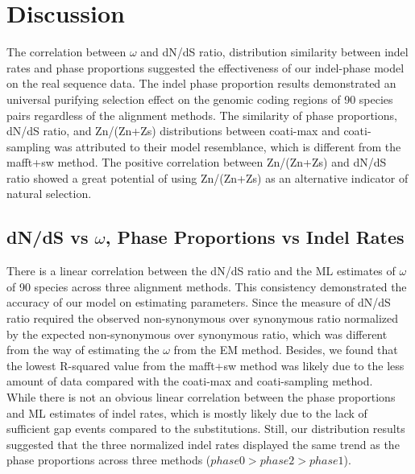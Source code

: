 \section{Discussion}
The correlation between $\omega$ and dN/dS ratio, distribution similarity between indel rates and phase proportions suggested the effectiveness of our indel-phase model on the real sequence data. The indel phase proportion results demonstrated an universal purifying selection effect on the genomic coding regions of 90 species pairs regardless of the alignment methods. The similarity of phase proportions, dN/dS ratio, and Zn/(Zn+Zs) distributions between coati-max and coati-sampling was attributed to their model resemblance, which is different from the mafft+sw method. The positive correlation between Zn/(Zn+Zs) and dN/dS ratio showed a great potential of using Zn/(Zn+Zs) as an alternative indicator of natural selection.

\subsection{dN/dS vs $\omega$, Phase Proportions vs Indel Rates}
There is a linear correlation between the dN/dS ratio and the ML estimates of $\omega$ of 90 species across three alignment methods. This consistency demonstrated the accuracy of our model on estimating parameters. Since the measure of dN/dS ratio required the observed non-synonymous over synonymous ratio normalized by the expected non-synonymous over synonymous ratio, which was different from the way of estimating the $\omega$ from the EM method. Besides, we found that the lowest R-squared value from the mafft+sw method was likely due to the less amount of data compared with the coati-max and coati-sampling method. \\
\indent While there is not an obvious linear correlation between the phase proportions and ML estimates of indel rates, which is mostly likely due to the lack of sufficient gap events compared to the substitutions. Still, our distribution results suggested that the three normalized indel rates displayed the same trend as the phase proportions across three methods ($phase 0 > phase 2 > phase 1$).    

